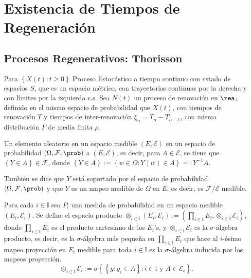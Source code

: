 %
\section{Existencia de Tiempos de Regeneraci\'on}
%

\subsection{Procesos Regenerativos: Thorisson}

Para $\left\{X\left(t\right):t\geq0\right\}$ Proceso Estoc\'astico a tiempo continuo con estado de espacios $S$, que es un espacio m\'etrico, con trayectorias continuas por la derecha y con l\'imites por la izquierda c.s. Sea $N\left(t\right)$ un proceso de renovaci\'on en $\rea_{+}$ definido en el mismo espacio de probabilidad que $X\left(t\right)$, con tiempos de renovaci\'on $T$ y tiempos de inter-renovaci\'on $\xi_{n}=T_{n}-T_{n-1}$, con misma distribuci\'on $F$ de media finita $\mu$.

\begin{Def}
Un elemento aleatorio en un espacio medible $\left(E,\mathcal{E}\right)$ en un espacio de probabilidad $\left(\Omega,\mathcal{F},\prob\right)$ a $\left(E,\mathcal{E}\right)$, es decir,
para $A\in \mathcal{E}$,  se tiene que $\left\{Y\in A\right\}\in\mathcal{F}$, donde $\left\{Y\in A\right\}:=\left\{w\in\Omega:Y\left(w\right)\in A\right\}=:Y^{-1}A$.
\end{Def}

\begin{Note}
Tambi\'en se dice que $Y$ est\'a soportado por el espacio de probabilidad $\left(\Omega,\mathcal{F},\prob\right)$ y que $Y$ es un mapeo medible de $\Omega$ en $E$, es decir, es $\mathcal{F}/\mathcal{E}$ medible.
\end{Note}

\begin{Def}
Para cada $i\in \mathbb{I}$ sea $P_{i}$ una medida de probabilidad en un espacio medible $\left(E_{i},\mathcal{E}_{i}\right)$. Se define el espacio producto
$\otimes_{i\in\mathbb{I}}\left(E_{i},\mathcal{E}_{i}\right):=\left(\prod_{i\in\mathbb{I}}E_{i},\otimes_{i\in\mathbb{I}}\mathcal{E}_{i}\right)$, donde $\prod_{i\in\mathbb{I}}E_{i}$ es el producto cartesiano de los $E_{i}$'s, y $\otimes_{i\in\mathbb{I}}\mathcal{E}_{i}$ es la $\sigma$-\'algebra producto, es decir, es la $\sigma$-\'algebra m\'as peque\~na en $\prod_{i\in\mathbb{I}}E_{i}$ que hace al $i$-\'esimo mapeo proyecci\'on en $E_{i}$ medible para toda $i\in\mathbb{I}$ es la $\sigma$-\'algebra inducida por los mapeos proyecci\'on. $$\otimes_{i\in\mathbb{I}}\mathcal{E}_{i}:=\sigma\left\{\left\{y:y_{i}\in A\right\}:i\in\mathbb{I}\textrm{ y }A\in\mathcal{E}_{i}\right\}.$$
\end{Def}


